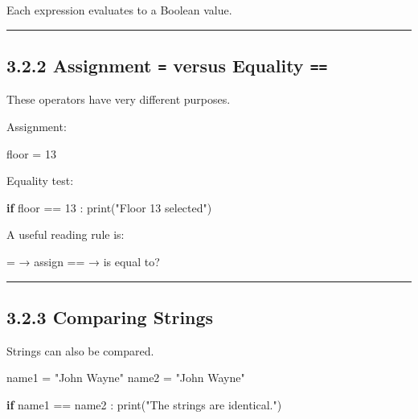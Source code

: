 \documentclass[
  11pt,
  a4paper,
]{article}
\newenvironment{Shaded}{}{}
\newcommand{\BuiltInTok}[1]{\textcolor[rgb]{0.00,0.50,0.00}{#1}}
\newcommand{\ControlFlowTok}[1]{\textcolor[rgb]{0.00,0.44,0.13}{\textbf{#1}}}
\newcommand{\DecValTok}[1]{\textcolor[rgb]{0.25,0.63,0.44}{#1}}
\newcommand{\NormalTok}[1]{#1}
\newcommand{\OperatorTok}[1]{\textcolor[rgb]{0.40,0.40,0.40}{#1}}
\newcommand{\StringTok}[1]{\textcolor[rgb]{0.25,0.44,0.63}{#1}}
\begin{document}
Each expression evaluates to a Boolean value.

\begin{center}\rule{0.5\linewidth}{0.5pt}\end{center}

\subsection{\texorpdfstring{3.2.2 Assignment \texttt{=} versus Equality
\texttt{==}}{3.2.2 Assignment = versus Equality ==}}\label{assignment-versus-equality}

These operators have very different purposes.

Assignment:

\begin{Shaded}
\begin{Highlighting}[]
\NormalTok{floor }\OperatorTok{=} \DecValTok{13}
\end{Highlighting}
\end{Shaded}

Equality test:

\begin{Shaded}
\begin{Highlighting}[]
\ControlFlowTok{if}\NormalTok{ floor }\OperatorTok{==} \DecValTok{13}\NormalTok{ :}
    \BuiltInTok{print}\NormalTok{(}\StringTok{"Floor 13 selected"}\NormalTok{)}
\end{Highlighting}
\end{Shaded}

A useful reading rule is:

\begin{Shaded}
\begin{Highlighting}[]
\NormalTok{=   → assign}
\NormalTok{==  → is equal to?}
\end{Highlighting}
\end{Shaded}

\begin{center}\rule{0.5\linewidth}{0.5pt}\end{center}

\subsection{3.2.3 Comparing Strings}\label{comparing-strings}

Strings can also be compared.

\begin{Shaded}
\begin{Highlighting}[]
\NormalTok{name1 }\OperatorTok{=} \StringTok{"John Wayne"}
\NormalTok{name2 }\OperatorTok{=} \StringTok{"John Wayne"}

\ControlFlowTok{if}\NormalTok{ name1 }\OperatorTok{==}\NormalTok{ name2 :}
    \BuiltInTok{print}\NormalTok{(}\StringTok{"The strings are identical."}\NormalTok{)}
\end{Highlighting}
\end{Shaded}
\end{document}
